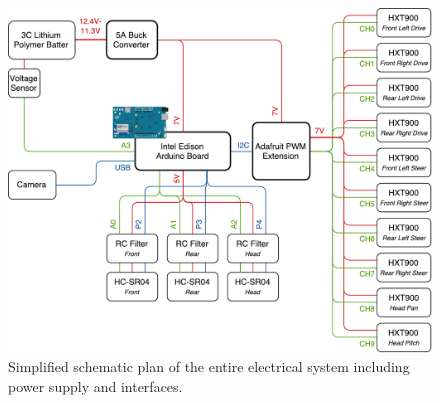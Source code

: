       \begin{figure}[h!]
        \centering
        \includegraphics[width=1\linewidth]{figures/elecDesign-electricalSchematic}
        \caption[Simplified schematic plan of the entire electrical system including power supply and interfaces.]{Simplified schematic plan of the entire electrical system including power supply and interfaces.}
        \label{fig:elecDesign-electricalSchematic}
      \end{figure}